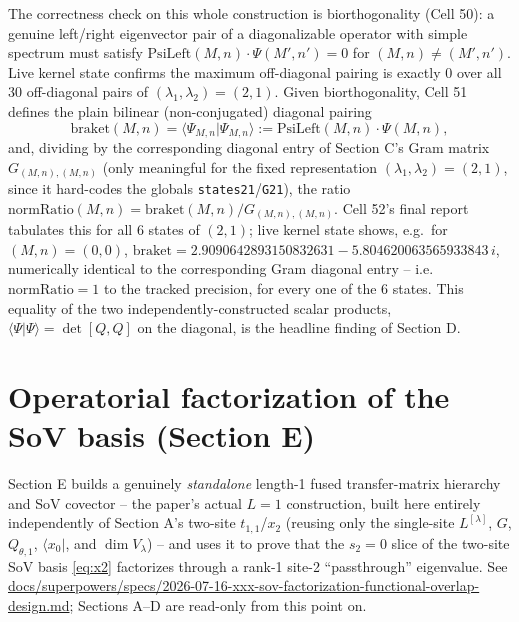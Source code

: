 \documentclass[11pt]{article}
\newcommand{\qthone}{Q_{\theta,1}}
\begin{document}
The correctness check on this whole construction is biorthogonality (Cell 50): a genuine left/right
eigenvector pair of a diagonalizable operator with simple spectrum must satisfy
$\mathrm{PsiLeft}(M,n)\cdot\Psi(M',n')=0$ for $(M,n)\neq(M',n')$. Live kernel state confirms the
maximum off-diagonal pairing is exactly $0$ over all 30 off-diagonal pairs of $(\lambda_1,\lambda_2)=(2,1)$.
Given biorthogonality, Cell 51 defines the plain bilinear (non-conjugated) diagonal pairing
\[
  \mathrm{braket}(M,n) = \langle\Psi_{M,n}|\Psi_{M,n}\rangle := \mathrm{PsiLeft}(M,n)\cdot\Psi(M,n),
\]
and, dividing by the corresponding diagonal entry of Section C's Gram matrix
$G_{(M,n),(M,n)}$ (only meaningful for the fixed representation $(\lambda_1,\lambda_2)=(2,1)$, since
it hard-codes the globals \texttt{states21}/\texttt{G21}), the ratio
$\mathrm{normRatio}(M,n) = \mathrm{braket}(M,n)/G_{(M,n),(M,n)}$. Cell 52's final report tabulates
this for all 6 states of $(2,1)$; live kernel state shows, e.g.\ for $(M,n)=(0,0)$,
$\mathrm{braket} = 2.9090642893150832631 - 5.804620063565933843\,i$, numerically identical to the
corresponding Gram diagonal entry -- i.e.\ $\mathrm{normRatio}=1$ to the tracked precision, for
every one of the 6 states. This equality of the two independently-constructed scalar products,
$\langle\Psi|\Psi\rangle = \det[Q,Q]$ on the diagonal, is the headline finding of Section D.

\section{Operatorial factorization of the SoV basis (Section E)}
\label{sec:factorization}

Section E builds a genuinely \emph{standalone} length-1 fused transfer-matrix hierarchy and SoV
covector -- the paper's actual $L=1$ construction, built here entirely independently of Section A's
two-site $t_{1,1}$/$x_2$ (reusing only the single-site $L^{[\lambda]}$, $G$, $\qthone$,
$\langle x_0|$, and $\dim V_\lambda$) -- and uses it to prove that the $s_2=0$ slice of the two-site
SoV basis \eqref{eq:x2} factorizes through a rank-1 site-2 ``passthrough'' eigenvalue. See
\url{docs/superpowers/specs/2026-07-16-xxx-sov-factorization-functional-overlap-design.md};
Sections A--D are read-only from this point on.
\end{document}
